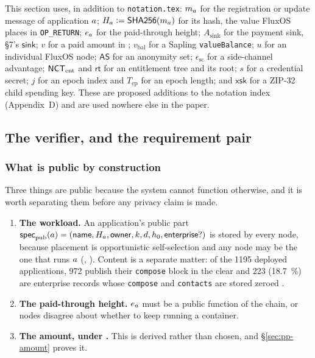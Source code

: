 \begin{remark}
This section uses, in addition to \texttt{notation.tex}: $m_{a}$ for the registration or update
message of application $a$; $H_{a} \vcentcolon= \mathsf{SHA256}(m_{a})$ for its hash, the value FluxOS
places in \texttt{OP\_RETURN}; $e_{a}$ for the paid-through height; $A_{\mathrm{sink}}$ for the
payment sink, \S7's $\mathsf{sink}$; $v$ for a paid amount in \sat; $v_{\mathrm{bal}}$ for a Sapling \texttt{valueBalance};
$u$ for an individual FluxOS node; $\mathsf{AS}$ for an anonymity set; $\epsilon_{\mathrm{sc}}$ for a
side-channel advantage; $\mathsf{NCT}_{\mathrm{ent}}$ and $\mathsf{rt}$ for an entitlement tree and its root;
$s$ for a credential secret; $j$ for an epoch index and $T_{\mathrm{ep}}$ for an epoch length; and
$\mathsf{xsk}$ for a ZIP-32 child spending key. These are proposed additions to the notation index
(Appendix~D) and are used nowhere else in the paper.
\end{remark}

\subsection{The verifier, and the requirement pair}
\label{sec:pp-requirements}

\subsubsection{What is public by construction}

Three things are public because the system cannot function otherwise, and it is worth separating them
before any privacy claim is made.

\begin{enumerate}
  \item \textbf{The workload.} An application's public part
    $\mathsf{spec}_{\mathrm{pub}}(a) = (\mathsf{name}, H_{a}, \mathsf{owner}, k, d,
    h_0, \mathsf{enterprise?})$ is stored by every node, because placement is opportunistic
    self-selection and any node may be the one that runs $a$ (\shipped, ).
    Content is a separate matter: of the \num{1195} deployed applications, \num{972} publish their
    \texttt{compose} block in the clear and \num{223} (\qty{18.7}{\percent}) are enterprise records
    whose \texttt{compose} and \texttt{contacts} are stored zeroed
    .
  \item \textbf{The paid-through height.} $e_{a}$ must be a public function of the chain, or nodes
    disagree about whether to keep running a container.
  \item \textbf{The amount, under \PNR.} This is derived rather than chosen, and
    \S\ref{sec:pp-amount} proves it.
\end{enumerate}

